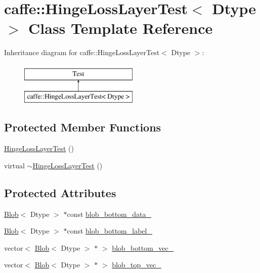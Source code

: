 \hypertarget{classcaffe_1_1_hinge_loss_layer_test}{\section{caffe\+:\+:Hinge\+Loss\+Layer\+Test$<$ Dtype $>$ Class Template Reference}
\label{classcaffe_1_1_hinge_loss_layer_test}
}
Inheritance diagram for caffe\+:\+:Hinge\+Loss\+Layer\+Test$<$ Dtype $>$\+:\begin{figure}[H]
\begin{center}
\leavevmode
\includegraphics[height=2.000000cm]{classcaffe_1_1_hinge_loss_layer_test}
\end{center}
\end{figure}
\subsection*{Protected Member Functions}
\begin{DoxyCompactItemize}
\item 
\hyperlink{classcaffe_1_1_hinge_loss_layer_test_a0f145b65fe5c9f18761e27640c23ea1c}{Hinge\+Loss\+Layer\+Test} ()
\item 
virtual \hyperlink{classcaffe_1_1_hinge_loss_layer_test_af3418152e64659da16a3a5ed31c6721a}{$\sim$\+Hinge\+Loss\+Layer\+Test} ()
\end{DoxyCompactItemize}
\subsection*{Protected Attributes}
\begin{DoxyCompactItemize}
\item 
\hyperlink{classcaffe_1_1_blob}{Blob}$<$ Dtype $>$ $\ast$const \hyperlink{classcaffe_1_1_hinge_loss_layer_test_a86c856e37099156adab0197c38ce74ec}{blob\+\_\+bottom\+\_\+data\+\_\+}
\item 
\hyperlink{classcaffe_1_1_blob}{Blob}$<$ Dtype $>$ $\ast$const \hyperlink{classcaffe_1_1_hinge_loss_layer_test_a67cfd73cc1d49d8c959d05da2a5e15ef}{blob\+\_\+bottom\+\_\+label\+\_\+}
\item 
vector$<$ \hyperlink{classcaffe_1_1_blob}{Blob}$<$ Dtype $>$ $\ast$ $>$ \hyperlink{classcaffe_1_1_hinge_loss_layer_test_a9ab9805216e3120f98b6fd151c715ece}{blob\+\_\+bottom\+\_\+vec\+\_\+}
\item 
vector$<$ \hyperlink{classcaffe_1_1_blob}{Blob}$<$ Dtype $>$ $\ast$ $>$ \hyperlink{classcaffe_1_1_hinge_loss_layer_test_ae5653c7c55dff58664cfe3ad8093757e}{blob\+\_\+top\+\_\+vec\+\_\+}
\end{DoxyCompactItemize}


